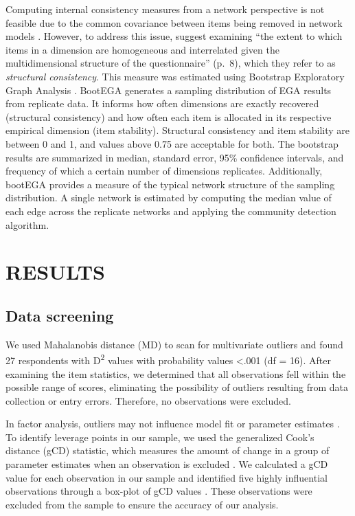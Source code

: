 \documentclass[
  12pt,
  twoside,
  openright,
  a4paper,
  chapter=TITLE,
  section=TITLE,
  brazil]{abntex2}
\begin{document}
Computing internal consistency measures from a network perspective is
not feasible due to the common covariance between items being removed in
network models \autocite{christensen2020b}. However, to address this
issue, \textcite{christensen2020b} suggest examining ``the extent to
which items in a dimension are homogeneous and interrelated given the
multidimensional structure of the questionnaire'' (p.~8), which they
refer to as \emph{structural consistency}. This measure was estimated
using Bootstrap Exploratory Graph Analysis
\autocite[bootEGA,][]{christensen2021a}. BootEGA generates a sampling
distribution of EGA results from replicate data. It informs how often
dimensions are exactly recovered (structural consistency) and how often
each item is allocated in its respective empirical dimension (item
stability). Structural consistency and item stability are between 0 and
1, and values above 0.75 are acceptable for both. The bootstrap results
are summarized in median, standard error, 95\% confidence intervals, and
frequency of which a certain number of dimensions replicates.
Additionally, bootEGA provides a measure of the typical network
structure of the sampling distribution. A single network is estimated by
computing the median value of each edge across the replicate networks
and applying the community detection algorithm.

\hypertarget{results}{%
\section{RESULTS}\label{results}}

\hypertarget{data-screening}{%
\subsection{Data screening}\label{data-screening}}

We used Mahalanobis distance (MD) to scan for multivariate outliers and
found 27 respondents with D\textsuperscript{2} values with probability
values \textless.001 (df = 16). After examining the item statistics, we
determined that all observations fell within the possible range of
scores, eliminating the possibility of outliers resulting from data
collection or entry errors. Therefore, no observations were excluded.

In factor analysis, outliers may not influence model fit or parameter
estimates \autocite{pek2011}. To identify leverage points in our sample,
we used the generalized Cook's distance (gCD) statistic, which measures
the amount of change in a group of parameter estimates when an
observation is excluded \autocite{pek2011}. We calculated a gCD value
for each observation in our sample and identified five highly
influential observations through a box-plot of gCD values
\autocite{flora2012}. These observations were excluded from the sample
to ensure the accuracy of our analysis.
\end{document}
